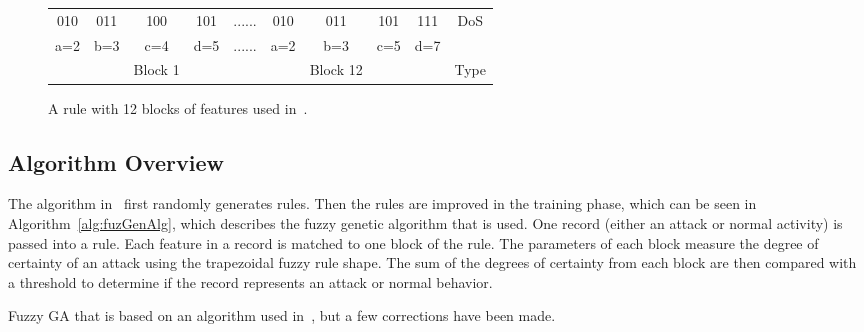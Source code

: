 \documentclass{sig-alternate}
\begin{document}
\begin{figure*}
\centering
\caption{A rule with 12 blocks of features used in~\cite{6496342, 6559603}.}
\vspace{0.20cm}
\begin{tabular}{|cccc|c|cccc|c|} \hline
010 & 011 & 100 & 101   & ...... & 010 & 011 & 101 & 111   & DoS\\
a=2 & b=3 & c=4 & d=5   & ...... & a=2 & b=3 & c=5 & d=7   &\\ 
    &     & Block 1&    &        &     & Block 12& &       & Type\\
\hline\end{tabular}
\label{fig:rule}
\end{figure*}




\subsection{Algorithm Overview}
The algorithm in~\cite{6496342, 6559603} first randomly generates rules. Then the rules are improved in the training phase, which can be seen in Algorithm~\ref{alg:fuzGenAlg}, which describes the fuzzy genetic algorithm that is used. One record (either an attack or normal activity) is passed into a rule. Each feature in a record is matched to one block of the rule. The parameters of each block measure the degree of certainty of an attack using the trapezoidal fuzzy rule shape. The sum of the degrees of certainty from each block are then compared with a threshold to determine if the record represents an attack or normal behavior.

\begin{algorithm}[t]
\caption{Fuzzy GA that is based on an algorithm used in~\cite{6496342, 6559603}, but a few corrections have been made.}
\label{alg:fuzGenAlg}
\begin{algorithmic}

    \ENDFOR
    
      \ELSE {}
    \ENDIF
  \ENDFOR
  
\ENDFOR
{}
\end{algorithmic}
\end{algorithm}
\end{document}
